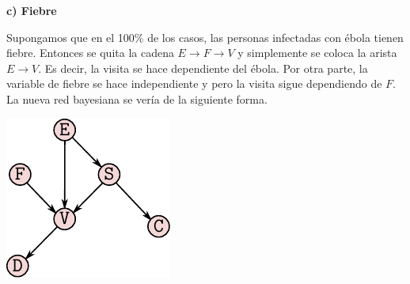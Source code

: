 \documentclass{article}
\begin{document}
\textbf{c) Fiebre}

Supongamos que en el 100\% de los casos, las personas infectadas con ébola tienen fiebre. Entonces se quita la cadena $E \rightarrow F \rightarrow V$ y simplemente se coloca la arista $E \rightarrow V$. Es decir, la visita se hace dependiente del ébola. Por otra parte, la variable de fiebre se hace independiente y pero la visita sigue dependiendo de $F$. La nueva red bayesiana se vería de la siguiente forma.

\begin{center}
\includegraphics[scale=1]{ej4}
\end{center}
\end{document}
